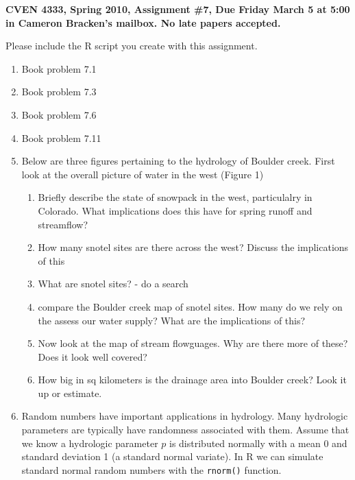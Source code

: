 \documentclass[11pt]{article}
\begin{document}
\textbf{CVEN 4333, Spring 2010, Assignment \#7, Due Friday March 5 at 5:00 in Cameron Bracken's mailbox. No late papers accepted.}

Please include the \textsf{R} script you create with this assignment.

\begin{enumerate}

\item Book problem 7.1
\item Book problem 7.3
\item Book problem 7.6
\item Book problem 7.11

\item Below are three figures pertaining to the hydrology of Boulder creek. First look at the overall picture of water in the west (Figure 1)
\begin{enumerate}
\item Briefly describe the state of snowpack in the west, particulalry in Colorado. What implications does this have for spring runoff and streamflow?


\item How many snotel sites are there across the west? Discuss the implications of this

\item What are snotel sites? - do a search

\item compare the Boulder creek map of snotel sites. How many do we rely on the assess our water supply? What are the implications of this?


\item Now look at the map of stream flowguages. Why are there more of
     these? Does it look well covered?

\item How big in sq kilometers is the drainage area into Boulder creek? Look it up or estimate.
\end{enumerate}

\item Random numbers have important applications in hydrology.  Many hydrologic parameters are typically have randomness associated with them.  Assume that we know a hydrologic parameter $p$ is distributed normally with a mean 0 and standard deviation 1 (a standard normal variate). In \textsf{R} we can simulate standard normal random numbers with the \texttt{rnorm()} function.


\end{enumerate}
\end{document}
